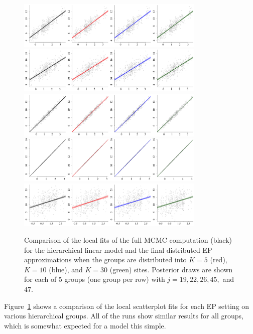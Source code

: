 \begin{figure}
\centering
    \includegraphics[width=0.8\textwidth]{figures/ep_sim/linear_fit_1.png}
     \includegraphics[width=0.8\textwidth]{figures/ep_sim/linear_fit_2.png}
     \includegraphics[width=0.8\textwidth]{figures/ep_sim/linear_fit_3.png}
     \includegraphics[width=0.8\textwidth]{figures/ep_sim/linear_fit_4.png}
     \includegraphics[width=0.8\textwidth]{figures/ep_sim/linear_fit_5.png}
\caption{Comparison of the local fits of the full MCMC computation (black) for the hierarchical linear model and the final distributed EP approximations when the groups are distributed into $K=5$ (red), $K=10$ (blue), and $K=30$ (green) sites. Posterior draws are shown for each of 5 groups (one group per row) with $j = 19, 22, 26, 45,$ and $47$.}
\label{fig:ep_results_linear}
\end{figure}

Figure~\ref{fig:ep_results_linear} shows a comparison of the local scatterplot fits for each EP setting on various hierarchical groups. All of the runs show similar results for all groups, which is somewhat expected for a model this simple. 

